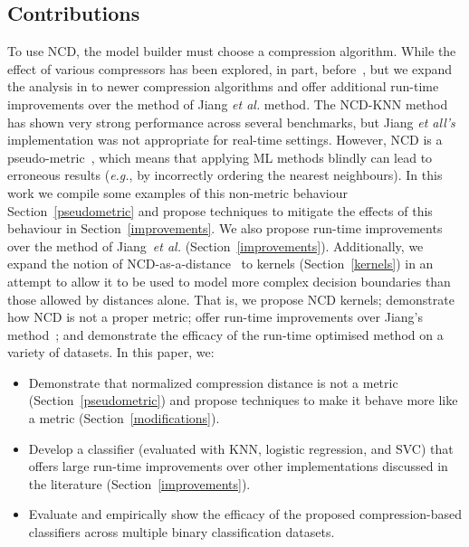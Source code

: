 \documentclass[preprint,12pt]{article}
\begin{document}
\subsection{Contributions}
To use NCD, the model builder must choose a compression algorithm. 
While the effect of various compressors has been explored, in part, before~\cite{ncd_pitfalls}, but we expand the analysis in \cite{ncd_pitfalls} to newer compression algorithms and offer additional run-time improvements over the method of Jiang \textit{et al.} method.
The NCD-KNN method has shown very strong performance across several benchmarks, but Jiang \textit{et all's} implementation was not appropriate for real-time settings. 
However, NCD is a pseudo-metric~\cite{opitz2023gzip, weinreich2023parameter, nishida2011tweet, jiang2022less}, which means that applying ML methods blindly can lead to erroneous results (\textit{e.g.}, by incorrectly ordering the nearest neighbours).  
In this work we compile some examples of this non-metric behaviour Section~\ref{pseudometric} and propose techniques to mitigate the effects of this behaviour in Section~\ref{improvements}.
We also propose run-time improvements over the method of Jiang~\textit{et al.} (Section~\ref{improvements}).
Additionally, we expand the notion of NCD-as-a-distance~\cite{opitz2023gzip,weinreich2023parameter,nishida2011tweet,ncd,jiang2022less} to kernels (Section~\ref{kernels}) in an attempt to allow it to be used to model more complex decision boundaries than those allowed by distances alone.
That is, we propose NCD kernels; demonstrate how NCD is not a proper metric; offer run-time improvements over Jiang's method~\cite{jiang2022less}; 
and demonstrate the efficacy of the run-time optimised method on a variety of datasets. 
In this paper, we:

\begin{itemize}
    \item Demonstrate that normalized compression distance is not a metric (Section~\ref{pseudometric}) and propose techniques to make it behave more like a metric (Section~\ref{modifications}).
    \item Develop a classifier (evaluated with KNN, logistic regression, and SVC) that offers large run-time improvements over other implementations discussed in the literature (Section~\ref{improvements}).
    \item Evaluate and empirically show the efficacy of the proposed compression-based classifiers across multiple binary classification datasets.
\end{itemize}
\end{document}
